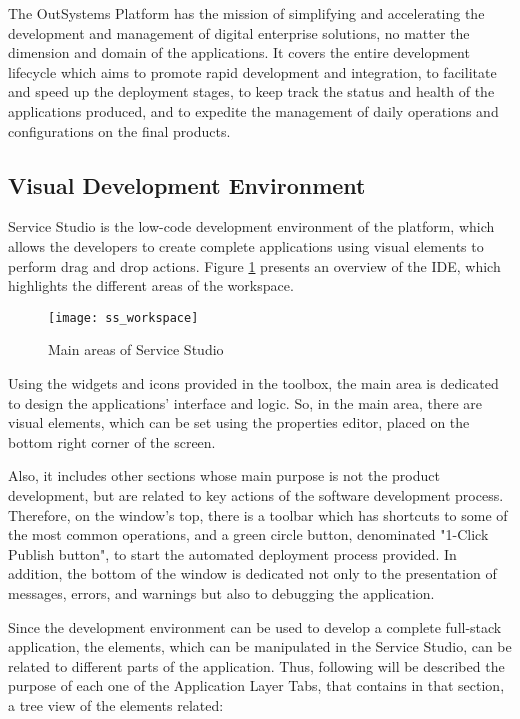 The OutSystems Platform has the mission of simplifying and accelerating the development and management of digital enterprise solutions, no matter the dimension and domain of the applications. It covers the entire development lifecycle which aims to promote rapid development and integration, to facilitate and speed up the deployment stages, to keep track the status and health of the applications produced, and to expedite the management of daily operations and configurations on the final products. \cite{eg_developingWithOutsystems}

\subsection{Visual Development Environment}
\label{subsec:visual_development_environment}

Service Studio is the low-code development environment of the platform, which allows the developers to create complete applications using visual elements to perform drag and drop actions. Figure \ref{fig:ss_workspace} presents an overview of the IDE, which highlights the different areas of the workspace.

\begin{figure}[htbp]
	\centering
	\texttt{[image: ss\_workspace]}
	\caption{Main areas of Service Studio \cite{serviceStudioOverview}}
	\label{fig:ss_workspace}
\end{figure}

Using the widgets and icons provided in the toolbox, the main area is dedicated to design the applications’ interface and logic. So, in the main area, there are visual elements, which can be set using the properties editor, placed on the bottom right corner of the screen. 

Also, it includes other sections whose main purpose is not the product development, but are related to key actions of the software development process. Therefore, on the window’s top, there is a toolbar which has shortcuts to some of the most common operations, and a green circle button, denominated "1-Click Publish button", to start the automated deployment process provided. In addition, the bottom of the window is dedicated not only to the presentation of messages, errors, and warnings but also to debugging the application.

Since the development environment can be used to develop a complete full-stack application, the elements, which can be manipulated in the Service Studio, can be related to different parts of the application. Thus, following will be described the purpose of each one of the Application Layer Tabs, that contains in that section, a tree view of the elements related:

